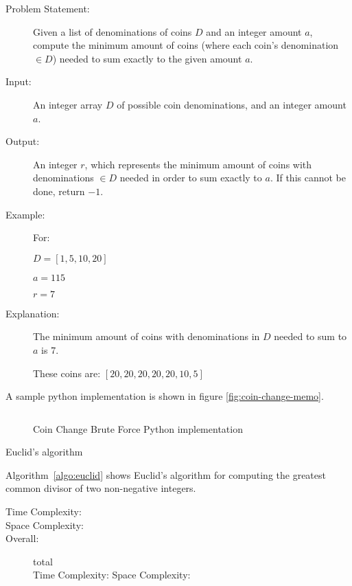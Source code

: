 \begin{description}
    \item[Problem Statement:]
        Given a list of denominations of coins $D$ and an integer amount $a$, compute the minimum amount of coins (where each coin's denomination $\in D$) needed to sum exactly to the given amount $a$.
        
    \item[Input:] 
        An integer array $D$ of possible coin denominations, and an integer amount $a$.
        
    \item[Output:] 
        An integer $r$, which represents the minimum amount of coins with denominations $\in D$ needed in order to sum exactly to $a$. If this cannot be done, return $-1$.
        
    \item[Example:]
        For: 

        $D = [1, 5, 10, 20]$

        $a = 115$

        $r = 7$

    \item[Explanation:]
        The minimum amount of coins with denominations in $D$ needed to sum to $a$ is 7.

        These coins are: $[20,20,20,20,20,10,5]$


\end{description}

A sample python implementation is shown in figure \ref{fig:coin-change-memo}.

\begin{figure}[H]
    \centering
    \begin{lstlisting}

    \end{lstlisting}
    \caption{Coin Change Brute Force Python implementation}
    \label{fig:coin-change-bf}
\end{figure}


\begin{algorithm}
    \caption{Euclid's algorithm}
    \label{algo:euclid}
\end{algorithm}

Algorithm~\ref{algo:euclid} shows Euclid's algorithm for computing the greatest common divisor of two non-negative integers.


\begin{description}
    \item[Time Complexity:]
        
        
    \item[Space Complexity:] 
        
        
    \item[Overall:] total\\
        Time Complexity:
        Space Complexity:
        

\end{description}